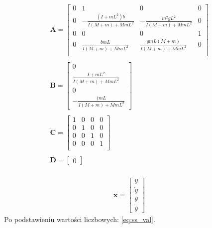 \documentclass{article}
\begin{document}
\begin{equation}\label{eq:ss}
 \begin{array}{l}
  \mathbf{A} = \begin{bmatrix}  0 & 1 & 0 & 0 \\
  							   0 & -\frac{(I+mL^2)b}{I(M+m) + MmL^2} & -\frac{m^2gL^2}{I(M+m) + MmL^2} & 0 \\
  							   0 & 0 & 0 & 1 \\
  							   0 & \frac{bmL}{I(M+m) + MmL^2} & \frac{gmL(M+m)}{I(M+m) + MmL^2} & 0 \\ 
  			   \end{bmatrix} \\ \\
  			   
  \mathbf{B} = \begin{bmatrix} 0 \\ \frac{I + mL^2}{I(M+m) + MmL^2} \\ 0 \\ -\frac{(mL}{I(M+m) + MmL^2} \end{bmatrix} \\ \\
  
  \mathbf{C} = \begin{bmatrix}  1 & 0 & 0 & 0 \\
  							   0 & 1 & 0 & 0 \\
  							   0 & 0 & 1 & 0 \\
  							   0 & 0 & 0 & 1 \\ 
  			   \end{bmatrix} \\ \\
  
  \mathbf{D} = \begin{bmatrix} 0 \end{bmatrix} \\
\end{array}
\end{equation}

\begin{equation}\label{eq:sv}
 \begin{array}{l}
	\mathbf{x} = 
	\begin{bmatrix} 
	  y \\ \dot{y} \\ \theta \\ \dot{\theta} 
	\end{bmatrix} 
 \end{array}
\end{equation}
Po podstawieniu wartości liczbowych: \ref{eq:ss_val}.
\end{document}
